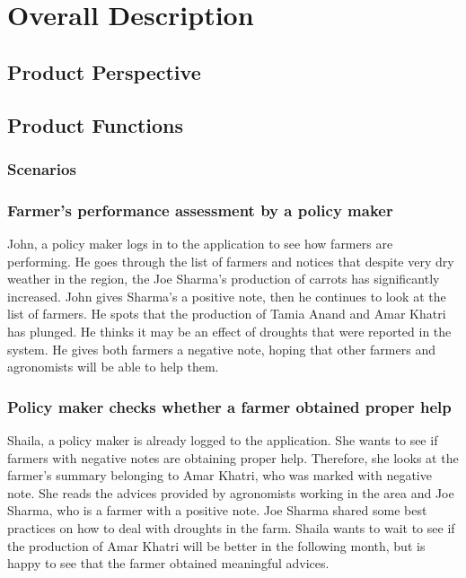 \chapter{Overall Description}
%  

\section{Product Perspective}

\section{Product Functions}
\subsection{Scenarios}
\subsection*{Farmer's performance assessment by a policy maker}
John, a policy maker logs in to the application to see how farmers are performing. He goes through the list of farmers and notices that despite very dry weather in the region, the Joe Sharma's production of carrots has significantly increased. John gives Sharma's a positive note, then he continues to look at the list of farmers. He spots that the production of Tamia Anand and Amar Khatri has plunged. He thinks it may be an effect of droughts that were reported in the system. He gives both farmers a negative note, hoping that other farmers and agronomists will be able to help them.

\subsection*{Policy maker checks whether a farmer obtained proper help}
Shaila, a policy maker is already logged to the application. She wants to see if farmers with negative notes are obtaining proper help. Therefore, she looks at the farmer's summary belonging to Amar Khatri, who was marked with negative note. She reads the advices provided by agronomists working in the area and Joe Sharma, who is a farmer with a positive note. Joe Sharma shared some best practices on how to deal with droughts in the farm. Shaila wants to wait to see if the production of Amar Khatri will be better in the following month, but is happy to see that the farmer obtained meaningful advices.

